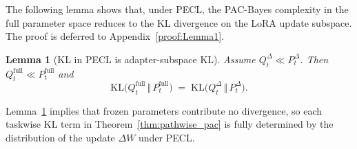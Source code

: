\documentclass{article}
\theoremstyle{plain}
\newtheorem{lemma}[theorem]{Lemma}
\newtheorem{corollary}[theorem]{Corollary}
\theoremstyle{definition}
\theoremstyle{remark}
\begin{document}
The following lemma shows that, under PECL, the PAC-Bayes complexity in the full parameter space reduces to the KL divergence on the LoRA update subspace.
The proof is deferred to Appendix~\ref{proof:Lemma1}.
\begin{lemma}[KL in PECL is adapter-subspace KL]
\label{lem:kl-decomp-pecl}
Assume $Q_t^\Delta \ll P_t^\Delta$. Then $Q_t^{\mathrm{full}} \ll P_t^{\mathrm{full}}$ and
$$
\mathrm{KL}\bigl(Q_t^{\mathrm{full}} \,\Vert\, P_t^{\mathrm{full}}\bigr)
\;=\;
\mathrm{KL}\bigl(Q_t^\Delta \,\Vert\, P_t^\Delta\bigr).
$$
\end{lemma}
Lemma~\ref{lem:kl-decomp-pecl} implies that frozen parameters contribute no divergence, so each taskwise KL term in Theorem~\ref{thm:pathwise_pac} is fully determined by the distribution of the update $\Delta W$ under PECL.
\end{document}
